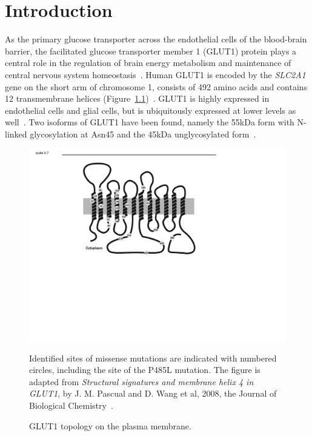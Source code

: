 
\chapter{Introduction} %
\label{Chapter1} %

As the primary glucose transporter across the endothelial cells of the blood-brain barrier, the facilitated glucose transporter member 1 (GLUT1) protein plays a central role in the regulation of brain energy metabolism and maintenance of central nervous system homeostasis~\cite{Pascual}. Human GLUT1 is encoded by the \textit{SLC2A1} gene on the short arm of chromosome 1, consists of 492 amino acids and contains 12 transmembrane \textalpha{} helices (Figure~\ref{fig:topo})~\cite{MUECKLER,Uldry}. GLUT1 is highly expressed in endothelial cells and glial cells, but is ubiquitously expressed at lower levels as well~\cite{Lee,Wheeler}. Two isoforms of GLUT1 have been found, namely the 55kDa form with N-linked glycosylation at Asn45 and the 45kDa unglycosylated form~\cite{Paul-W.-Hruz,Duelli}.
\begin{figure}[h]
\centering
\includegraphics[scale=0.7]{Figures/topology}
\caption{GLUT1 topology on the plasma membrane.}
\vspace*{-3mm}
\small \justify
Identified sites of missense mutations are indicated with numbered circles, including the site of the P485L mutation. The figure is adapted from \textit{Structural signatures and membrane helix 4 in GLUT1}, by J. M. Pascual and D. Wang et al, 2008, the Journal of Biological Chemistry~\cite{Pascual}.
\label{fig:topo}
\end{figure}

